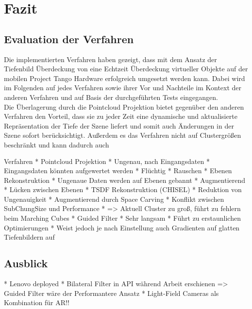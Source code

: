 \chapter{Fazit} \label{sec:conclusion}

\section{Evaluation der Verfahren}

Die implementierten Verfahren haben gezeigt, dass mit dem Ansatz der Tiefenbild Überdeckung von \citet{wloka1995resolving} eine Echtzeit Überdeckung virtueller Objekte auf der mobilen Project Tango Hardware erfolgreich umgesetzt werden kann. Dabei wird im Folgenden auf jedes Verfahren sowie ihrer Vor und Nachteile im Kontext der anderen Verfahren und auf Basis der durchgeführten Tests eingegangen. \\

Die Überlagerung durch die Pointcloud Projektion bietet gegenüber den anderen Verfahren den Vorteil, dass sie zu jeder Zeit eine dynamische und aktualisierte Repräsentation der Tiefe der Szene liefert und somit auch Änderungen in der Szene sofort berücksichtigt. Außerdem es das Verfahren nicht auf Clustergrößen beschränkt und kann dadurch auch



Verfahren
* Pointcloud Projektion
	* Ungenau, nach Eingangsdaten
	* Eingangsdaten könnten aufgewertet werden
	* Flüchtig
	* Rauschen
* Ebenen Rekonstruktion
	* Ungenaue Daten werden auf Ebenen gebannt
	* Augmentierend
	* Lücken zwischen Ebenen 
* TSDF Rekonstruktion (CHISEL)
	* Reduktion von Ungenauigkeit
	* Augmentierend durch Space Carving
	* Konflikt zwischen SubChungSize und Performance
	* => Aktuell Cluster zu groß, führt zu fehlern beim Marching Cubes
* Guided Filter
	* Sehr langsam
	* Führt zu erstaunlichen Optimierungen
	* Weist jedoch je nach Einstellung auch Gradienten auf glatten Tiefenbildern auf


\section{Ausblick}

* Lenovo deployed
* Bilateral Filter in API während Arbeit erschienen => Guided Filter wäre der Performantere Ansatz
* Light-Field Cameras als Kombination für AR!!


	
	